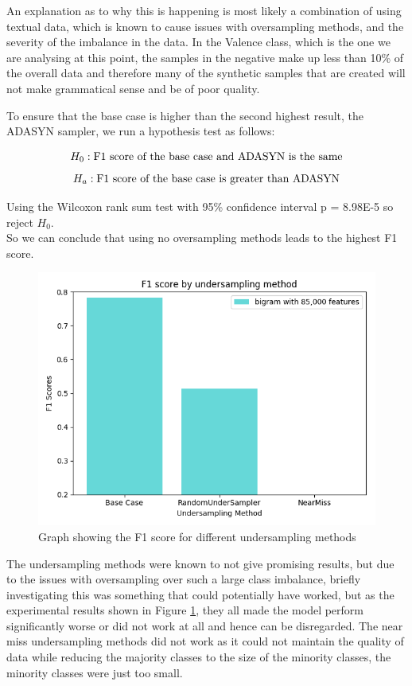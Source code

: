An explanation as to why this is happening is most likely a combination of using textual data, which is known to cause issues with oversampling methods, and the severity of the imbalance in the data. In the Valence class, which is the one we are analysing at this point, the samples in the negative make up less than 10\% of the overall data and therefore many of the synthetic samples that are created will not make grammatical sense and be of poor quality. 

To ensure that the base case is higher than the second highest result, the ADASYN sampler, we run a hypothesis test as follows:

$$ H_0: \textnormal{F1 score of the base case and ADASYN is the same} $$
$$ H_a: \textnormal{F1 score of the base case is greater than ADASYN} $$

Using the Wilcoxon rank sum test with 95\% confidence interval p = 8.98E-5 so reject $H_0$. \\ So we can conclude that using no oversampling methods leads to the highest F1 score.

\begin{figure}[h]
\centering
\includegraphics[scale=0.6]{graphs/undersampleNB.png}
\caption{Graph showing the F1 score for different undersampling methods}
\label{undersamplegraph}
\end{figure}

The undersampling methods were known to not give promising results, but due to the issues with oversampling over such a large class imbalance, briefly investigating this was something that could potentially have worked, but as the experimental results shown in Figure \ref{undersamplegraph}, they all made the model perform significantly worse or did not work at all and hence can be disregarded. The near miss undersampling methods did not work as it could not maintain the quality of data while reducing the majority classes to the size of the minority classes, the minority classes were just too small.


